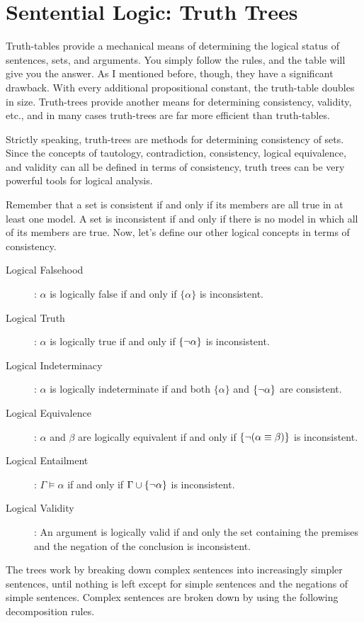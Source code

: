 \documentclass[../logic-text.tex]{subfiles}
\begin{document}
\chapter{Sentential Logic: Truth Trees}
\label{"waiting for reftex-label call..."}


Truth-tables provide a mechanical means of determining the logical status of sentences, sets, and arguments. You simply follow the rules, and the table will give you the answer. As I mentioned before, though, they have a significant drawback. With every additional propositional constant, the truth-table doubles in size. Truth-trees provide another means for determining consistency, validity, etc., and in many cases truth-trees are far more efficient than truth-tables. 

Strictly speaking, truth-trees are methods for determining consistency of sets. Since the concepts of tautology, contradiction, consistency, logical equivalence, and validity can all be defined in terms of consistency, truth trees can be very powerful tools for logical analysis.

Remember that a set is consistent if and only if its members are all true in at least one model. A set is inconsistent if and only if there is no model in which all of its members are true. Now, let's define our other logical concepts in terms of consistency.


\begin{description}
  \item[Logical Falsehood]: \(\alpha\) is logically false if and only if \(\{\alpha\}\) is inconsistent.
  \item[Logical Truth]: \(\alpha\) is logically true if and only if \(\{\neg \alpha\}\) is inconsistent.
  \item[Logical Indeterminacy]: \(\alpha\) is logically indeterminate if and both \(\{\alpha\}\) and \(\{\neg \alpha\}\) are consistent.
  \item[Logical Equivalence]: \(\alpha\) and \(\beta\) are logically equivalent if and only if \(\{ \neg (\alpha \equiv \beta)\}\) is inconsistent.
  \item[Logical Entailment]: \(\Gamma \vDash \alpha\) if and only if \(\Gamma \cup \{\neg \alpha\}\) is inconsistent.
  \item[Logical Validity]: An argument is logically valid if and only the set containing the premises and the negation of the conclusion is inconsistent. 
\end{description}

The trees work by breaking down complex sentences into increasingly simpler sentences, until nothing is left except for simple sentences and the negations of simple sentences. Complex sentences are broken down by using the following decomposition rules.  
\end{document}
